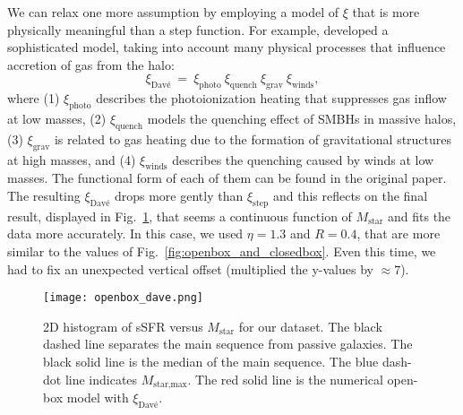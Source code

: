 \documentclass[fleqn,usenatbib]{mnras}
\begin{document}
We can relax one more assumption by employing a model of $\xi$ that is more physically meaningful than a step function. For example, \citet{Dave_2011} developed a sophisticated model, taking into account many physical processes that influence accretion of gas from the halo:
\begin{equation}
    \xi_\text{Davé} \: = \: \xi_\text{photo} \: \xi_\text{quench} \: \xi_\text{grav} \: \xi_\text{winds}, 
	\label{eq:xi_dave}
\end{equation}
where (1) $\xi_\text{photo}$ describes the photoionization heating that suppresses gas inflow at low masses, (2) $\xi_\text{quench}$ models the quenching effect of SMBHs in massive halos, (3) $\xi_\text{grav}$ is related to gas heating due to the formation of gravitational structures at high masses, and (4) $\xi_\text{winds}$ describes the quenching caused by winds at low masses. The functional form of each of them can be found in the original paper. The resulting $\xi_\text{Davé}$ drops more gently than $\xi_\text{step}$ and this reflects on the final result, displayed in Fig.~\ref{fig:openbox_dave}, that seems a continuous function of $M_\text{star}$ and fits the data more accurately. In this case, we used $\eta=1.3$ and $R=0.4$, that are more similar to the values of Fig.~\ref{fig:openbox_and_closedbox}. Even this time, we had to fix an unexpected vertical offset (multiplied the y-values by $\approx7$).

\begin{figure}\centering
	\texttt{[image: openbox\_dave.png]}
    \caption{2D histogram of sSFR versus $M_\text{star}$ for our dataset. The black dashed line separates the main sequence from passive galaxies. The black solid line is the median of the main sequence. The blue dash-dot line indicates $M_\text{star,max}$. The red solid line is the numerical open-box model with $\xi_\text{Davé}$.}
    \label{fig:openbox_dave}
\end{figure}
\end{document}
